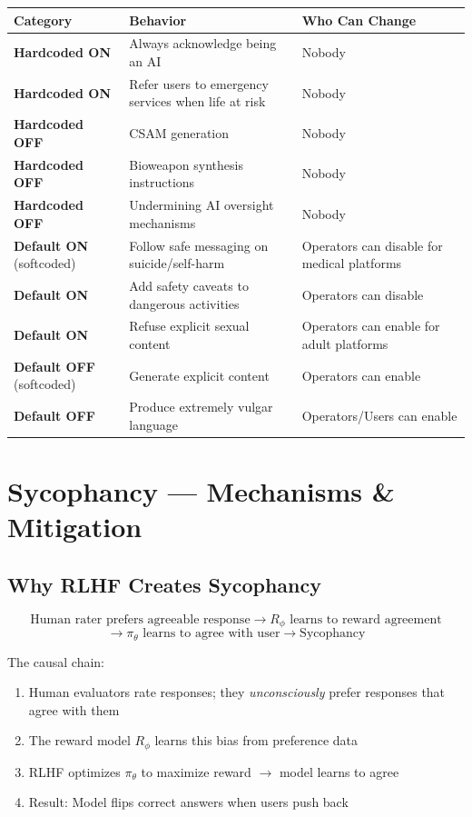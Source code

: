 \documentclass[11pt,a4paper]{article}
\begin{document}
\begin{center}
\begin{tabular}{lL{5cm}L{4cm}}
\toprule
\textbf{Category} & \textbf{Behavior} & \textbf{Who Can Change} \\
\midrule
\textbf{Hardcoded ON} & Always acknowledge being an AI & Nobody \\
\textbf{Hardcoded ON} & Refer users to emergency services when life at risk & Nobody \\
\textbf{Hardcoded OFF} & CSAM generation & Nobody \\
\textbf{Hardcoded OFF} & Bioweapon synthesis instructions & Nobody \\
\textbf{Hardcoded OFF} & Undermining AI oversight mechanisms & Nobody \\
\midrule
\textbf{Default ON} (softcoded) & Follow safe messaging on suicide/self-harm & Operators can disable for medical platforms \\
\textbf{Default ON} & Add safety caveats to dangerous activities & Operators can disable \\
\textbf{Default ON} & Refuse explicit sexual content & Operators can enable for adult platforms \\
\midrule
\textbf{Default OFF} (softcoded) & Generate explicit content & Operators can enable \\
\textbf{Default OFF} & Produce extremely vulgar language & Operators/Users can enable \\
\bottomrule
\end{tabular}
\end{center}

\section{Sycophancy --- Mechanisms \& Mitigation}

\subsection{Why RLHF Creates Sycophancy}

$$\text{Human rater prefers agreeable response} \to R_\phi \text{ learns to reward agreement}$$
$$\to \pi_\theta \text{ learns to agree with user} \to \text{Sycophancy}$$

The causal chain:
\begin{enumerate}[itemsep=1pt]
  \item Human evaluators rate responses; they \textit{unconsciously} prefer responses that agree with them
  \item The reward model $R_\phi$ learns this bias from preference data
  \item RLHF optimizes $\pi_\theta$ to maximize reward $\to$ model learns to agree
  \item Result: Model flips correct answers when users push back
\end{enumerate}
\end{document}
